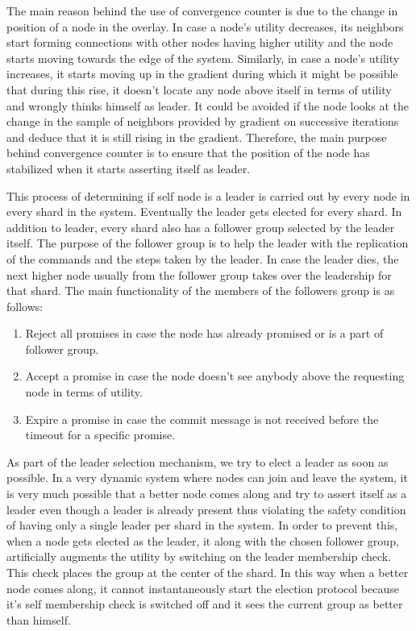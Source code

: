 \documentclass[12pt,a4paper,twoside,openright]{book}
\begin{document}
\par The main reason behind the use of convergence counter is due to the change in position of a node in the overlay. In case a node's utility decreases, its neighbors start forming connections with other nodes having higher utility and the node starts moving towards the edge of the system. Similarly, in case a node's utility increases, it starts moving up in the gradient during which it might be possible that during this rise, it doesn't locate any node above itself in terms of utility and wrongly thinks himself as leader. It could be avoided if the node looks at the change in the sample of neighbors provided by gradient on successive iterations and deduce that it is still rising in the gradient. Therefore, the main purpose behind convergence counter is to ensure that the position of the node has stabilized when it starts asserting itself as leader. 

\par This process of determining if self node is a leader is carried out by every node in every shard in the system. Eventually the leader gets elected for every shard. In addition to leader, every shard also has a follower group selected by the leader itself. The purpose of the follower group is to help the leader with the replication of the commands and the steps taken by the leader. In case the leader dies, the next higher node usually from the follower group takes over the leadership for that shard. The main functionality of the members of the followers group is as follows:


\begin{enumerate}

\item Reject all promises in case the node has already promised or is a part of follower group.

\item Accept a promise in case the node doesn't see anybody above the requesting node in terms of utility.

\item Expire a promise in case the commit message is not received before the timeout for a specific promise.

\end{enumerate}


As part of the leader selection mechanism, we try to elect a leader as soon as possible. In a very dynamic system where nodes can join and leave the system, it is very much possible that a better node comes along and try to assert itself as a leader even though a leader is already present thus violating the safety condition of having only a single leader per shard in the system. In order to prevent this, when a node gets elected as the leader, it along with the chosen follower group, artificially augments the utility by switching on the leader membership check. This check places the group at the center of the shard. In this way when a better node comes along, it cannot instantaneously start the election protocol because it's self membership check is switched off and it sees the current group as better than himself. 
\end{document}
